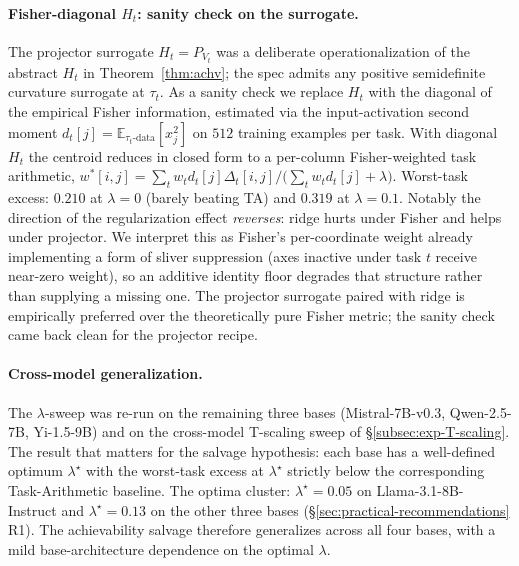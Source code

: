 \paragraph{Fisher-diagonal $H_t$: sanity check on the surrogate.}
The projector surrogate $H_t = P_{V_t}$ was a deliberate
operationalization of the abstract $H_t$ in
Theorem~\ref{thm:achv}; the spec admits any positive
semidefinite curvature surrogate at $\tau_t$. As a sanity check we
replace $H_t$ with the diagonal of the empirical Fisher information,
estimated via the input-activation second moment
$d_t[j] = \mathbb{E}_{\tau_t\text{-data}}[x_j^2]$ on $512$
training examples per task. With diagonal $H_t$ the centroid
reduces in closed form to a per-column Fisher-weighted task
arithmetic, $w^{*}[i,j] = \sum_t w_t d_t[j] \Delta_t[i,j] /
\big(\sum_t w_t d_t[j] + \lambda\big)$. Worst-task excess: $0.210$
at $\lambda = 0$ (barely beating TA) and $0.319$ at $\lambda = 0.1$.
Notably the direction of the regularization effect \emph{reverses}:
ridge hurts under Fisher and helps under projector. We interpret
this as Fisher's per-coordinate weight already implementing a
form of sliver suppression (axes inactive under task $t$ receive
near-zero weight), so an additive identity floor degrades that
structure rather than supplying a missing one. The projector
surrogate paired with ridge is empirically preferred over the
theoretically pure Fisher metric; the sanity check came back clean
for the projector recipe.

\paragraph{Cross-model generalization.}
The $\lambda$-sweep was re-run on the remaining three bases
(Mistral-7B-v0.3, Qwen-2.5-7B, Yi-1.5-9B) and on the cross-model
T-scaling sweep of \S\ref{subsec:exp-T-scaling}. The result that
matters for the salvage hypothesis: each base has a well-defined
optimum $\lambda^\star$ with the worst-task excess at $\lambda^\star$
strictly below the corresponding Task-Arithmetic baseline. The
optima cluster: $\lambda^\star = 0.05$ on Llama-3.1-8B-Instruct
and $\lambda^\star = 0.13$ on the other three bases
(\S\ref{sec:practical-recommendations} R1). The achievability
salvage therefore generalizes across all four bases, with a
mild base-architecture dependence on the optimal $\lambda$.

